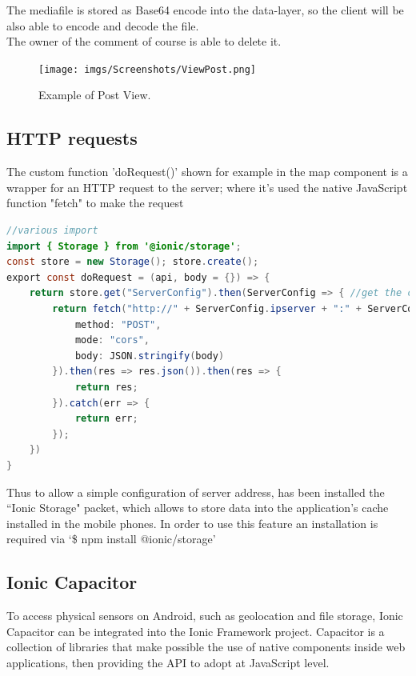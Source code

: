 \documentclass[conference]{IEEEtran}
\begin{document}
The mediafile is stored as Base64 encode into the data-layer, so the client will be also able to encode and decode the file.
\\
The owner of the comment of course is able to delete it.

\begin{figure}[htbp]
\begin{center}
{\texttt{[image: imgs/Screenshots/ViewPost.png]}}
\end{center}
\caption{Example of Post View.}
\label{fig}
\end{figure}


\subsection{HTTP requests}

The custom function 'doRequest()' shown for example in the map component is a wrapper for an HTTP request to the server; where it's used the native JavaScript function "fetch" to make the request
\begin{lstlisting}[language=Java, caption=Method doRequest to fetch server]
//various import 
import { Storage } from '@ionic/storage';
const store = new Storage(); store.create();
export const doRequest = (api, body = {}) => {
    return store.get("ServerConfig").then(ServerConfig => { //get the config from cache
        return fetch("http://" + ServerConfig.ipserver + ":" + ServerConfig.port + "/" + api, {
            method: "POST",
            mode: "cors",
            body: JSON.stringify(body)
        }).then(res => res.json()).then(res => {
            return res;
        }).catch(err => {
            return err;
        });
    })
}
\end{lstlisting}


Thus to allow a simple configuration of server address, has been installed the ``Ionic Storage" \cite{b9} packet, which allows to store data into the application's cache installed in the mobile phones. In order to use this feature an installation is required via `\$ npm install @ionic/storage'



\subsection{Ionic Capacitor}

To access physical sensors on Android, such as geolocation and file storage, Ionic Capacitor\cite{b10} can be integrated into the Ionic Framework project. Capacitor is a collection of libraries that make possible the use of native components inside web applications, then providing the API to adopt at JavaScript level.
\end{document}
